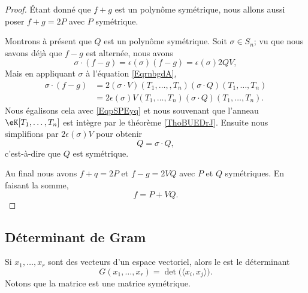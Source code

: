 \begin{proof}
    Étant donné que \( f+g\) est un polynôme symétrique, nous allons aussi poser \( f+g=2P\) avec \( P\) symétrique.

    Montrons à présent que \( Q\) est un polynôme symétrique. Soit \( \sigma\in S_n\); vu que nous savons déjà que \( f-g\) est alternée, nous avons
    \begin{equation}    \label{EqpSPEyq}
        \sigma\cdot (f-g)=\epsilon(\sigma)(f-g)=\epsilon(\sigma)2QV,
    \end{equation}
    Mais en appliquant \( \sigma\) à l'équation \eqref{EqrnbgdA},
    \begin{subequations}
        \begin{align}
            \sigma\cdot (f-g)&=2(\sigma\cdot V)(T_1,\ldots, ,T_n)(\sigma\cdot Q)(T_1,\ldots,T_n)\\
            &=2\epsilon(\sigma)V(T_1,\ldots, T_n)(\sigma\cdot Q)(T_1,\ldots, T_n).
        \end{align}
    \end{subequations}
    Nous égalisons cela avec \eqref{EqpSPEyq} et nous souvenant que l'anneau \( \eK[T_1,\ldots, T_n]\) est intègre par le théorème \ref{ThoBUEDrJ}. Ensuite nous simplifions par \( 2\epsilon(\sigma)V\) pour obtenir
    \begin{equation}
        Q=\sigma\cdot Q,
    \end{equation}
    c'est-à-dire que \( Q\) est symétrique.

    Au final nous avons \( f+q=2P\) et \( f-g=2VQ\) avec \( P\) et \( Q\) symétriques. En faisant la somme,
    \begin{equation}
        f=P+VQ.
    \end{equation}
\end{proof}

\subsection{Déterminant de Gram}

Si \( x_1,\ldots, x_r\) sont des vecteurs d'un espace vectoriel, alors le  est le déterminant
\begin{equation}
    G(x_1,\ldots, x_r)=\det\big( \langle x_i, x_j\rangle  \big).
\end{equation}
Notons que la matrice est une matrice symétrique.

